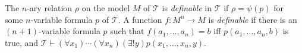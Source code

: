 The $n$-ary relation $\rho$ on the model $M$ of $\mathcal{T}$ is \emph{definable} in $\mathcal{T}$ if $\rho = \psi(p)$ for some $n$-variable formula $p$ of $\mathcal{T}$. A function $f: M^n \to M$ is \emph{definable} if there is an $(n+1)$-variable formula $p$ such that $f(a_1, \ldots, a_n) = b$ iff $p(a_1, \ldots, a_n, b)$ is true, and $\mathcal{T} \vdash (\forall x_1)\cdots(\forall x_n)(\exists!y)p(x_1, \ldots, x_n, y)$.
